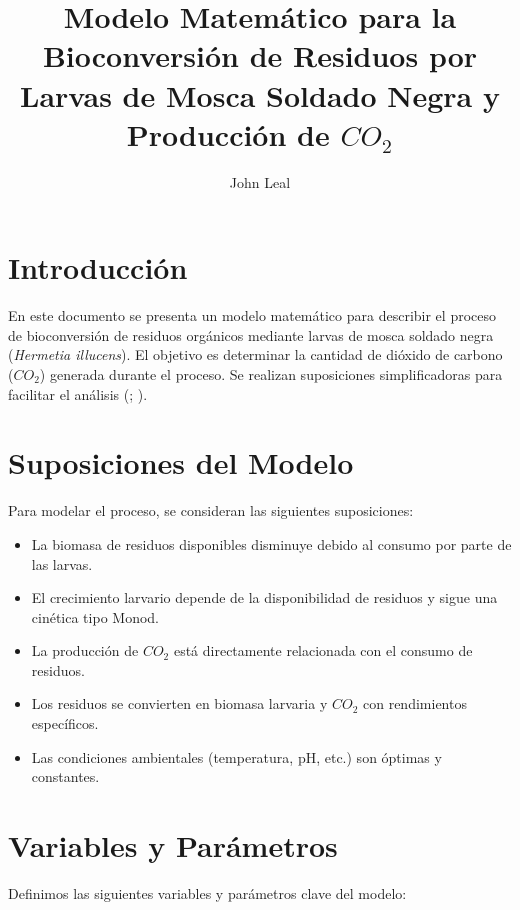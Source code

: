 \documentclass[12pt]{article}
\title{Modelo Matemático para la Bioconversión de Residuos por Larvas de Mosca Soldado Negra y Producción de $CO_2$}
\author{John Leal}
\date{}
\begin{document}
\maketitle

\section{Introducción}
En este documento se presenta un modelo matemático para describir el proceso de bioconversión de residuos orgánicos mediante larvas de mosca soldado negra (\textit{Hermetia illucens}). El objetivo es determinar la cantidad de dióxido de carbono ($CO_2$) generada durante el proceso. Se realizan suposiciones simplificadoras para facilitar el análisis (\cite{shulerbioprocess2017}; \cite{dienerConversionOrganicMaterial2011}).

\section{Suposiciones del Modelo}
Para modelar el proceso, se consideran las siguientes suposiciones:
\begin{itemize}
    \item La biomasa de residuos disponibles disminuye debido al consumo por parte de las larvas.
    \item El crecimiento larvario depende de la disponibilidad de residuos y sigue una cinética tipo Monod.
    \item La producción de $CO_2$ está directamente relacionada con el consumo de residuos.
    \item Los residuos se convierten en biomasa larvaria y $CO_2$ con rendimientos específicos.
    \item Las condiciones ambientales (temperatura, pH, etc.) son óptimas y constantes.
\end{itemize}

\section{Variables y Parámetros}
Definimos las siguientes variables y parámetros clave del modelo:
\end{document}

